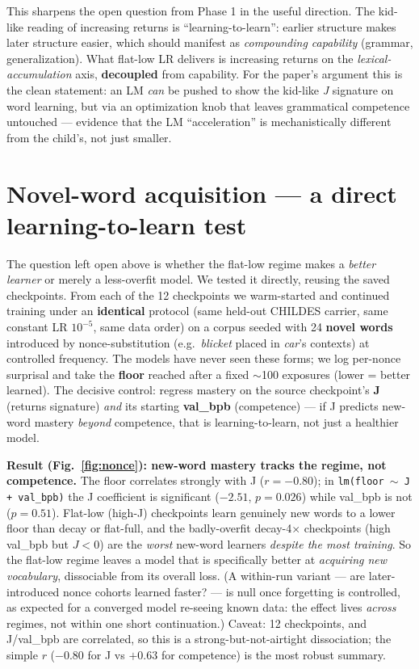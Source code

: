 \documentclass[11pt]{article}
\newcommand{\J}{\textit{J}}
\begin{document}
This sharpens the open question from Phase 1 in the useful direction. The kid-like reading of increasing
returns is ``learning-to-learn'': earlier structure makes later structure easier, which should manifest as
\emph{compounding capability} (grammar, generalization). What flat-low LR delivers is increasing returns on
the \emph{lexical-accumulation} axis, \textbf{decoupled} from capability. For the paper's argument this is
the clean statement: an LM \emph{can} be pushed to show the kid-like \J{} signature on word learning, but
via an optimization knob that leaves grammatical competence untouched --- evidence that the LM ``acceleration''
is mechanistically different from the child's, not just smaller.

\section{Novel-word acquisition --- a direct learning-to-learn test}
The question left open above is whether the flat-low regime makes a \emph{better learner} or merely a
less-overfit model. We tested it directly, reusing the saved checkpoints. From each of the 12 checkpoints
we warm-started and continued training under an \textbf{identical} protocol (same held-out CHILDES carrier,
same constant LR $10^{-5}$, same data order) on a corpus seeded with 24 \textbf{novel words} introduced by
nonce-substitution (e.g.\ \emph{blicket} placed in \emph{car}'s contexts) at controlled frequency. The
models have never seen these forms; we log per-nonce surprisal and take the \textbf{floor} reached after a
fixed $\sim$100 exposures (lower = better learned). The decisive control: regress mastery on the source
checkpoint's \textbf{J} (returns signature) \emph{and} its starting \textbf{val\_bpb} (competence) --- if J
predicts new-word mastery \emph{beyond} competence, that is learning-to-learn, not just a healthier model.

\textbf{Result (Fig.~\ref{fig:nonce}): new-word mastery tracks the regime, not competence.} The floor
correlates strongly with J ($r=-0.80$); in \texttt{lm(floor\,$\sim$\,J + val\_bpb)} the J coefficient is
significant ($-2.51$, $p=0.026$) while val\_bpb is not ($p=0.51$). Flat-low (high-J) checkpoints learn
genuinely new words to a lower floor than decay or flat-full, and the badly-overfit decay-4$\times$
checkpoints (high val\_bpb but $J<0$) are the \emph{worst} new-word learners \emph{despite the most
training}. So the flat-low regime leaves a model that is specifically better at \emph{acquiring new
vocabulary}, dissociable from its overall loss. (A within-run variant --- are later-introduced nonce
cohorts learned faster? --- is null once forgetting is controlled, as expected for a converged model
re-seeing known data: the effect lives \emph{across} regimes, not within one short continuation.)
Caveat: 12 checkpoints, and J/val\_bpb are correlated, so this is a strong-but-not-airtight dissociation;
the simple $r$ ($-0.80$ for J vs $+0.63$ for competence) is the most robust summary.
\end{document}
